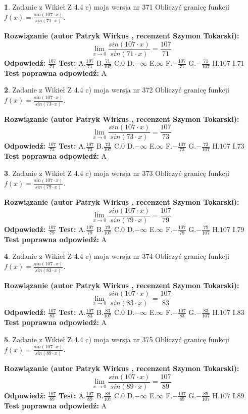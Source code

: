 \documentclass[12pt, a4paper]{article}
\theoremstyle{definition} %
\newtheorem{zad}{}
\newcommand{\zadStart}[1]{\begin{zad}#1\newline}
\newcommand{\zadStop}{\end{zad}}
\newcommand{\rozwStart}[2]{\noindent \textbf{Rozwiązanie (autor #1 , recenzent #2): }\newline}
\newcommand{\rozwStop}{\newline}
\newcommand{\odpStart}{\noindent \textbf{Odpowiedź:}\newline}
\newcommand{\odpStop}{\newline}
\newcommand{\testStart}{\noindent \textbf{Test:}\newline}
\newcommand{\testStop}{\newline}
\newcommand{\kluczStart}{\noindent \textbf{Test poprawna odpowiedź:}\newline}
\newcommand{\kluczStop}{\newline}
\begin{document}
\zadStart{Zadanie z Wikieł Z 4.4 c) moja wersja nr 371}
Obliczyć granicę funkcji $f(x)=\frac{sin(107\cdot x)}{sin(71\cdot x)}$.
\zadStop
\rozwStart{Patryk Wirkus}{Szymon Tokarski}
$$\lim\limits_{x\to 0}\frac{sin(107\cdot x)}{sin(71\cdot x)}=
\frac{107}{71}$$
\rozwStop
\odpStart
$\frac{107}{71}$
\odpStop
\testStart
A.$\frac{107}{71}$
B.$\frac{71}{107}$
C.$0$
D.$-\infty$
E.$\infty$
F.$-\frac{107}{71}$
G.$-\frac{71}{107}$
H.$107$
I.$71$
\testStop
\kluczStart
A
\kluczStop



\zadStart{Zadanie z Wikieł Z 4.4 c) moja wersja nr 372}
Obliczyć granicę funkcji $f(x)=\frac{sin(107\cdot x)}{sin(73\cdot x)}$.
\zadStop
\rozwStart{Patryk Wirkus}{Szymon Tokarski}
$$\lim\limits_{x\to 0}\frac{sin(107\cdot x)}{sin(73\cdot x)}=
\frac{107}{73}$$
\rozwStop
\odpStart
$\frac{107}{73}$
\odpStop
\testStart
A.$\frac{107}{73}$
B.$\frac{73}{107}$
C.$0$
D.$-\infty$
E.$\infty$
F.$-\frac{107}{73}$
G.$-\frac{73}{107}$
H.$107$
I.$73$
\testStop
\kluczStart
A
\kluczStop



\zadStart{Zadanie z Wikieł Z 4.4 c) moja wersja nr 373}
Obliczyć granicę funkcji $f(x)=\frac{sin(107\cdot x)}{sin(79\cdot x)}$.
\zadStop
\rozwStart{Patryk Wirkus}{Szymon Tokarski}
$$\lim\limits_{x\to 0}\frac{sin(107\cdot x)}{sin(79\cdot x)}=
\frac{107}{79}$$
\rozwStop
\odpStart
$\frac{107}{79}$
\odpStop
\testStart
A.$\frac{107}{79}$
B.$\frac{79}{107}$
C.$0$
D.$-\infty$
E.$\infty$
F.$-\frac{107}{79}$
G.$-\frac{79}{107}$
H.$107$
I.$79$
\testStop
\kluczStart
A
\kluczStop



\zadStart{Zadanie z Wikieł Z 4.4 c) moja wersja nr 374}
Obliczyć granicę funkcji $f(x)=\frac{sin(107\cdot x)}{sin(83\cdot x)}$.
\zadStop
\rozwStart{Patryk Wirkus}{Szymon Tokarski}
$$\lim\limits_{x\to 0}\frac{sin(107\cdot x)}{sin(83\cdot x)}=
\frac{107}{83}$$
\rozwStop
\odpStart
$\frac{107}{83}$
\odpStop
\testStart
A.$\frac{107}{83}$
B.$\frac{83}{107}$
C.$0$
D.$-\infty$
E.$\infty$
F.$-\frac{107}{83}$
G.$-\frac{83}{107}$
H.$107$
I.$83$
\testStop
\kluczStart
A
\kluczStop



\zadStart{Zadanie z Wikieł Z 4.4 c) moja wersja nr 375}
Obliczyć granicę funkcji $f(x)=\frac{sin(107\cdot x)}{sin(89\cdot x)}$.
\zadStop
\rozwStart{Patryk Wirkus}{Szymon Tokarski}
$$\lim\limits_{x\to 0}\frac{sin(107\cdot x)}{sin(89\cdot x)}=
\frac{107}{89}$$
\rozwStop
\odpStart
$\frac{107}{89}$
\odpStop
\testStart
A.$\frac{107}{89}$
B.$\frac{89}{107}$
C.$0$
D.$-\infty$
E.$\infty$
F.$-\frac{107}{89}$
G.$-\frac{89}{107}$
H.$107$
I.$89$
\testStop
\kluczStart
A
\kluczStop
\end{document}
